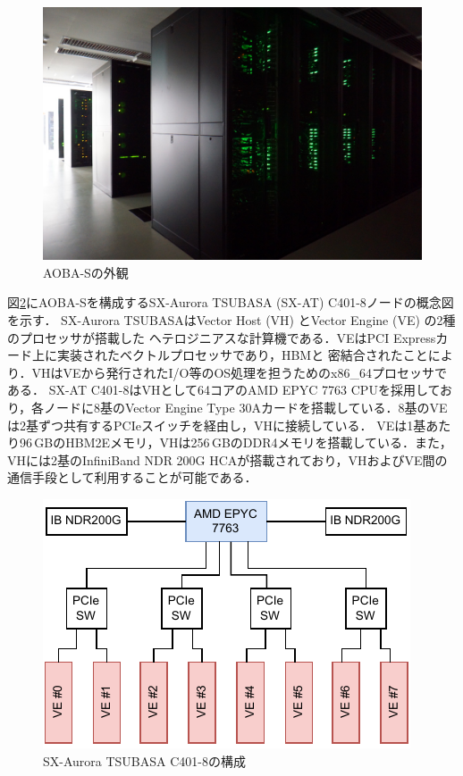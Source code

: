 ﻿\documentclass[submit,techrep,noauthor]{ipsj}
\begin{document}
\begin{figure}[tb]
  \centering
  \includegraphics[width=.9\columnwidth]{figs/rack.jpg}
  \caption{AOBA-Sの外観}\label{fig:aoba-s}
\end{figure}

図\ref{fig:node}にAOBA-Sを構成するSX-Aurora TSUBASA (SX-AT) C401-8ノードの概念図を示す．
SX-Aurora TSUBASAはVector Host (VH) とVector Engine (VE) の2種のプロセッサが搭載した
ヘテロジニアスな計算機である．VEはPCI Expressカード上に実装されたベクトルプロセッサであり，HBMと
密結合されたことにより．VHはVEから発行されたI/O等のOS処理を担うためのx86\_64プロセッサである．
SX-AT C401-8はVHとして64コアのAMD EPYC 7763 CPUを採用しており，各ノードに8基のVector Engine Type
30Aカードを搭載している．8基のVEは2基ずつ共有するPCIeスイッチを経由し，VHに接続している．
VEは1基あたり96\,GBのHBM2Eメモリ，VHは256\,GBのDDR4メモリを搭載している．また，VHには2基のInfiniBand
NDR 200G HCAが搭載されており，VHおよびVE間の通信手段として利用することが可能である．

\begin{figure}[tb]
  \centering
  \includegraphics{figs/node_arch.pdf}
  \caption{SX-Aurora TSUBASA C401-8の構成}\label{fig:node}
\end{figure}
\end{document}
